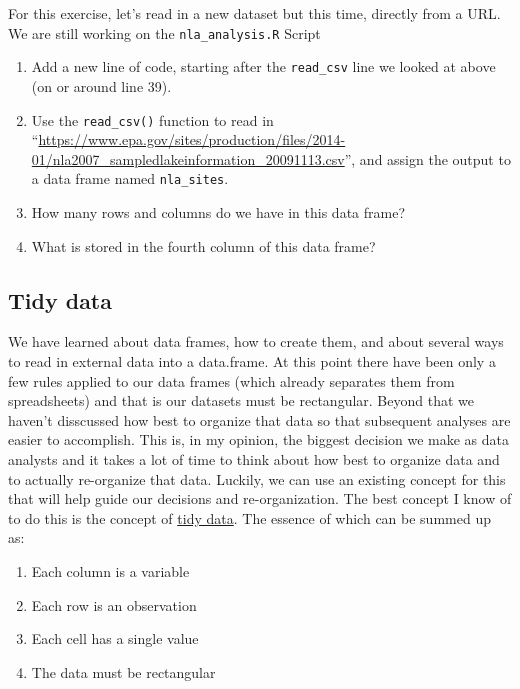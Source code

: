 \documentclass[]{article}
\providecommand{\tightlist}{%
  \setlength{\itemsep}{0pt}\setlength{\parskip}{0pt}}
\begin{document}
For this exercise, let's read in a new dataset but this time, directly
from a URL. We are still working on the \texttt{nla\_analysis.R} Script

\begin{enumerate}
\def\labelenumi{\arabic{enumi}.}
\tightlist
\item
  Add a new line of code, starting after the \texttt{read\_csv} line we
  looked at above (on or around line 39).\\
\item
  Use the \texttt{read\_csv()} function to read in
  ``\url{https://www.epa.gov/sites/production/files/2014-01/nla2007_sampledlakeinformation_20091113.csv}'',
  and assign the output to a data frame named \texttt{nla\_sites}.
\item
  How many rows and columns do we have in this data frame?\\
\item
  What is stored in the fourth column of this data frame?
\end{enumerate}

\hypertarget{tidy-data}{%
\subsection{Tidy data}\label{tidy-data}}

We have learned about data frames, how to create them, and about several
ways to read in external data into a data.frame. At this point there
have been only a few rules applied to our data frames (which already
separates them from spreadsheets) and that is our datasets must be
rectangular. Beyond that we haven't disscussed how best to organize that
data so that subsequent analyses are easier to accomplish. This is, in
my opinion, the biggest decision we make as data analysts and it takes a
lot of time to think about how best to organize data and to actually
re-organize that data. Luckily, we can use an existing concept for this
that will help guide our decisions and re-organization. The best concept
I know of to do this is the concept of
\href{http://r4ds.had.co.nz/tidy-data.html}{tidy data}. The essence of
which can be summed up as:

\begin{enumerate}
\def\labelenumi{\arabic{enumi}.}
\tightlist
\item
  Each column is a variable
\item
  Each row is an observation
\item
  Each cell has a single value
\item
  The data must be rectangular
\end{enumerate}
\end{document}
